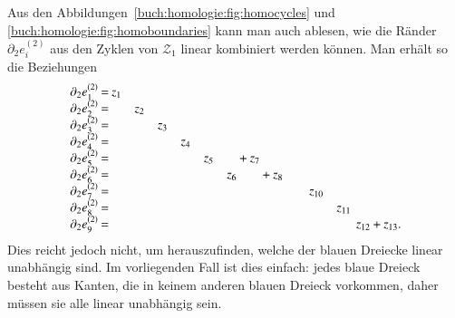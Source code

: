 Aus den Abbildungen~\ref{buch:homologie:fig:homocycles} und
\ref{buch:homologie:fig:homoboundaries} kann man auch ablesen,
wie die Ränder $\partial_2e_i^{(2)}$ aus den Zyklen von $\mathcal{Z}_1$
linear kombiniert werden können.
Man erhält so die Beziehungen
\begin{equation}
\setcounter{MaxMatrixCols}{29}
\setlength\arraycolsep{1pt}
\begin{array}{lcrcrcrcrcrcrcrcrcrcrcrcrcr}
\partial_2e_1^{(2)} &=&z_1& &   & &   & &   & &   & &   & &   & &   & &   & &      & &      & &      & &      \\
\partial_2e_2^{(2)} &=&   & &z_2& &   & &   & &   & &   & &   & &   & &   & &      & &      & &      & &      \\
\partial_2e_3^{(2)} &=&   & &   & &z_3& &   & &   & &   & &   & &   & &   & &      & &      & &      & &      \\
\partial_2e_4^{(2)} &=&   & &   & &   & &z_4& &   & &   & &   & &   & &   & &      & &      & &      & &      \\
\partial_2e_5^{(2)} &=&   & &   & &   & &   & &z_5& &   &+&z_7& &   & &   & &      & &      & &      & &      \\
\partial_2e_6^{(2)} &=&   & &   & &   & &   & &   & &z_6& &   &+&z_8& &   & &      & &      & &      & &      \\
\partial_2e_7^{(2)} &=&   & &   & &   & &   & &   & &   & &   & &   & &   & &z_{10}& &      & &      & &      \\
\partial_2e_8^{(2)} &=&   & &   & &   & &   & &   & &   & &   & &   & &   & &      & &z_{11}& &      & &      \\
\partial_2e_9^{(2)} &=&   &\phantom{+}&   &\phantom{+} &   &\phantom{+} &   &\phantom{+} &   &\phantom{+} &   &\phantom{+} &   &\phantom{+} &   &\phantom{+} &   &\phantom{+} &      &\phantom{+} &      & &z_{12}&+&z_{13}.
\end{array}
\end{equation}
Dies reicht jedoch nicht, um herauszufinden, welche der blauen Dreiecke
linear unabhängig sind.
Im vorliegenden Fall ist dies einfach: jedes blaue Dreieck besteht aus
Kanten, die in keinem anderen blauen Dreieck vorkommen, daher müssen
sie alle linear unabhängig sein.

